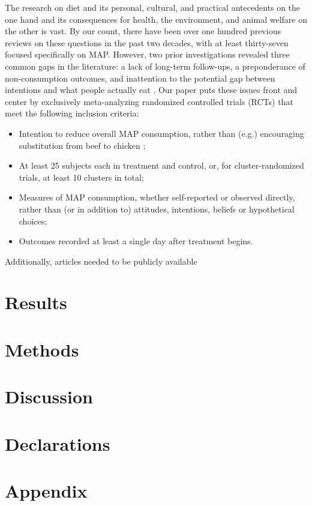\documentclass[sn-nature,pdflatex]{sn-jnl}
\begin{document}
The research on diet and its personal, cultural, and practical
antecedents on the one hand and its consequences for health, the
environment, and animal welfare on the other is vast. By our count,
there have been over one hundred previous reviews on these questions in
the past two decades, with at least thirty-seven focused specifically on
MAP. However, two prior investigations revealed three common gaps in the
literature: a lack of long-term follow-ups, a preponderance of
non-consumption outcomes, and inattention to the potential gap between
intentions and what people actually eat
\citep{mathur2021meta, mathur2021effectiveness}. Our paper puts these
issues front and center by exclusively meta-analyzing randomized
controlled trials (RCTs) that meet the following inclusion criteria:

\begin{itemize}
\item
  Intention to reduce overall MAP consumption, rather than (e.g.)
  encouraging substitution from beef to chicken
  \citep{mathur2022ethical};
\item
  At least 25 subjects each in treatment and control, or, for
  cluster-randomized trials, at least 10 clusters in total;
\item
  Measures of MAP consumption, whether self-reported or observed
  directly, rather than (or in addition to) attitudes, intentions,
  beliefs or hypothetical choices;
\item
  Outcomes recorded at least a single day after treatment begins.
\end{itemize}

Additionally, articles needed to be publicly available

\section{Results}\label{sec2}

\section{Methods}\label{sec3}

\section{Discussion}\label{sec4}

\backmatter



\section*{Declarations}\label{declarations}

\section{Appendix}\label{secA1}

\renewcommand\refname{Bibliography}

\end{document}
